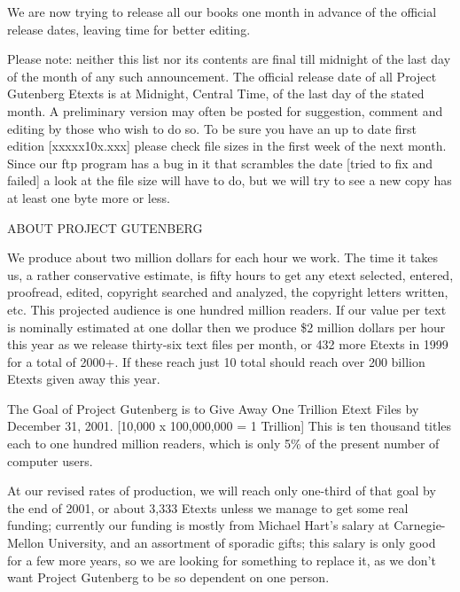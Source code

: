 \documentclass[12pt]{book}
\begin{document}
We are now trying to release all our books one month in advance
of the official release dates, leaving time for better editing.

Please note:  neither this list nor its contents are final till
midnight of the last day of the month of any such announcement.
The official release date of all Project Gutenberg Etexts is at
Midnight, Central Time, of the last day of the stated month.  A
preliminary version may often be posted for suggestion, comment
and editing by those who wish to do so.  To be sure you have an
up to date first edition [xxxxx10x.xxx] please check file sizes
in the first week of the next month.  Since our ftp program has
a bug in it that scrambles the date [tried to fix and failed] a
look at the file size will have to do, but we will try to see a
new copy has at least one byte more or less.

\newpage

\begin{center}
{\Large ABOUT PROJECT GUTENBERG}
\end{center}

We produce about two million dollars for each hour we work.  The
time it takes us, a rather conservative estimate, is fifty hours
to get any etext selected, entered, proofread, edited, copyright
searched and analyzed, the copyright letters written, etc.  This
projected audience is one hundred million readers.  If our value
per text is nominally estimated at one dollar then we produce \$2
million dollars per hour this year as we release thirty-six text
files per month, or 432 more Etexts in 1999 for a total of 2000+.
If these reach just 10%
total should reach over 200 billion Etexts given away this year.

The Goal of Project Gutenberg is to Give Away One Trillion Etext
Files by December 31, 2001.  [10,000 x 100,000,000 = 1 Trillion]
This is ten thousand titles each to one hundred million readers,
which is only 5\% of the present number of computer users.

At our revised rates of production, we will reach only one-third
of that goal by the end of 2001, or about 3,333 Etexts unless we
manage to get some real funding; currently our funding is mostly
from Michael Hart's salary at Carnegie-Mellon University, and an
assortment of sporadic gifts; this salary is only good for a few
more years, so we are looking for something to replace it, as we
don't want Project Gutenberg to be so dependent on one person.
\end{document}
